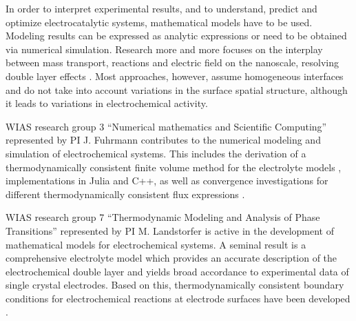 \documentclass[a4paper,10pt]{article}
\begin{document}
In order to interpret experimental results, and to understand, predict and optimize electrocatalytic systems, mathematical models have to be used.
Modeling results can be expressed as analytic expressions or need to be obtained via numerical simulation.
Research more and more focuses on the interplay between mass transport, reactions and  electric field on the nanoscale, resolving double layer effects \cite{lin2019understanding,tan2018double,eden2019modeling,bohra2019modeling}. Most approaches, however, assume homogeneous interfaces  and do not take into account variations in the surface spatial structure, although it  
leads to variations in electrochemical activity.


WIAS research group 3 ``Numerical mathematics and Scientific Computing'' represented by PI J. Fuhrmann contributes to the numerical modeling and simulation of electrochemical systems. This includes  the derivation of a thermodynamically consistent finite volume method \cite{JF2016} for the electrolyte models \cite{DGL2014,VagnerEtAl2019}, implementations in Julia and C++, as well as convergence investigations for  different thermodynamically consistent flux expressions \cite{CCFG2020}.   %

WIAS research group 7 ``Thermodynamic Modeling and Analysis of Phase Transitions'' represented by PI M. Landstorfer is active in the development of mathematical models for electrochemical systems.  A seminal result is a comprehensive electrolyte model which provides an accurate description of the electrochemical double layer and yields broad accordance to experimental data of single crystal electrodes. Based on this, thermodynamically consistent boundary conditions for electrochemical reactions at electrode surfaces have been developed \cite{DGM2013,DGL2014,Landstorfer2016187,landstorfer2017boundary}.
\end{document}
